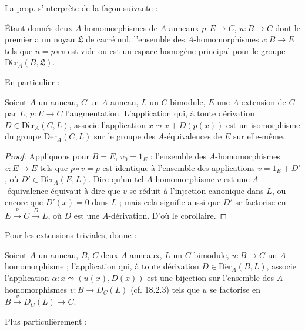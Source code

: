 La prop.  s'interprète de la façon suivante :

\begin{corollary}[20.1.3]
\label{0.20.1.3-fr}
Étant donnés deux $A$-homomorphismes de $A$-anneaux $p:E\to C$,
$u:B\to C$ dont le premier a un noyau $\mathfrak{L}$ de carré nul,
l'ensemble des $A$-homomorphismes $v:B\to E$ tels que $u=p\circ v$ est vide
ou est un espace homogène principal pour le groupe
$\operatorname{D\acute{e}r}_A(B,\mathfrak{L})$.
\end{corollary}

En particulier :

\begin{corollary}[20.1.4]
\label{0.20.1.4-fr}
Soient $A$ un anneau, $C$ un $A$-anneau, $L$ un $C$-bimodule, $E$ une
$A$-extension de $C$ par $L$, $p:E\to C$ l'augmentation. L'application qui,
à toute dérivation $D\in\operatorname{D\acute{e}r}_A(C,L)$, associe l'application
$x\leadsto x+D(p(x))$ est un isomorphisme du groupe
$\operatorname{D\acute{e}r}_A(C,L)$ sur le groupe des $A$-équivalences de $E$ sur
elle-même.
\end{corollary}

\begin{proof}
Appliquons  pour $B=E$, $v_0=1_E$ : l'ensemble
des $A$-homomorphismes $v:E\to E$ tels que $p\circ v=p$ est identique à
l'ensemble des applications $v=1_E+D'$, où
$D'\in\operatorname{D\acute{e}r}_A(E,L)$. Dire qu'un tel $A$-homomorphisme $v$ est
une $A$-équivalence équivaut à dire que $v$ se réduit à l'injection canonique
dans $L$, ou encore que $D'(x)=0$ dans $L$ ; mais cela signifie aussi que
$D'$ se factorise en $E\xrightarrow{p}C\xrightarrow{D}L$, où $D$ est une
$A$-dérivation. D'où le corollaire.
\end{proof}

Pour les extensions triviales,  donne :

\begin{corollary}[20.1.5]
\label{0.20.1.5-fr}
Soient $A$ un anneau, $B$, $C$ deux $A$-anneaux, $L$ un $C$-bimodule,
$u:B\to C$ un $A$-homomorphisme ; l'application qui, à toute dérivation
$D\in\operatorname{D\acute{e}r}_A(B,L)$, associe l'application
$\alpha:x\leadsto(u(x),D(x))$ est une bijection sur l'ensemble des
$A$-homomorphismes $v:B\to D_C(L)$ \textup{(cf. 18.2.3)} tels que $u$ se factorise en
$B\xrightarrow{v}D_C(L)\to C$.
\end{corollary}

Plus particulièrement :

